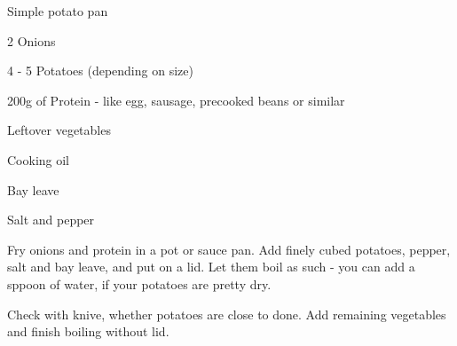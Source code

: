 \begin{recipe}{Simple potato pan}
    \begin{ingr}[1-2]
    \item 2 Onions
    \item 4 - 5 Potatoes (depending on size)
    \item 200g of Protein - like egg, sausage, precooked beans or similar
    \item Leftover vegetables
    \item Cooking oil
    \item Bay leave
    \item Salt and pepper
    \end{ingr}

    Fry onions and protein in a pot or sauce pan. Add finely cubed potatoes,
    pepper, salt and bay leave,
    and put on a lid. Let them boil as such - you can add a sppoon of water, if
    your potatoes are pretty dry.

    Check with knive, whether potatoes are
    close to done.
    Add remaining vegetables and finish boiling without lid.
\end{recipe}
